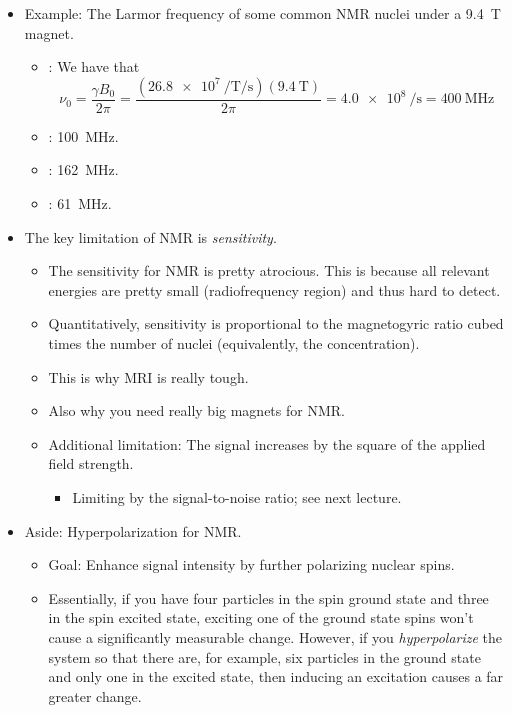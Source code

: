 \documentclass[../notes.tex]{subfiles}
\begin{document}
\begin{itemize}
\begin{itemize}
    \end{itemize}
    \item Example: The Larmor frequency of some common NMR nuclei under a \SI{9.4}{\tesla} magnet.
    \begin{itemize}
        \item {}: We have that
        \begin{equation*}
            \nu_0 = \frac{\gamma B_0}{2\pi}
            = \frac{(\SI{26.8e7}{\per\tesla\per\second})(\SI{9.4}{\tesla})}{2\pi}
            = \SI{4.0e8}{\per\second}
            = \SI{400}{\mega\hertz}
        \end{equation*}
        \item {}: \SI{100}{\mega\hertz}.
        \item {}: \SI{162}{\mega\hertz}.
        \item {}: \SI{61}{\mega\hertz}.
    \end{itemize}
    \item The key limitation of NMR is \emph{sensitivity}.
    \begin{itemize}
        \item The sensitivity for NMR is pretty atrocious. This is because all relevant energies are pretty small (radiofrequency region) and thus hard to detect.
        \item Quantitatively, sensitivity is proportional to the magnetogyric ratio cubed times the number of nuclei (equivalently, the concentration).
        \item This is why MRI is really tough.
        \item Also why you need really big magnets for NMR.
        \item Additional limitation: The signal increases by the square of the applied field strength.
        \begin{itemize}
            \item Limiting by the signal-to-noise ratio; see next lecture.
        \end{itemize}
    \end{itemize}
    \item Aside: Hyperpolarization for NMR.
    \begin{itemize}
        \item Goal: Enhance signal intensity by further polarizing nuclear spins.
        \item Essentially, if you have four particles in the spin ground state and three in the spin excited state, exciting one of the ground state spins won't cause a significantly measurable change. However, if you \emph{hyperpolarize} the system so that there are, for example, six particles in the ground state and only one in the excited state, then inducing an excitation causes a far greater change.

\end{itemize}
\end{itemize}
\end{document}

